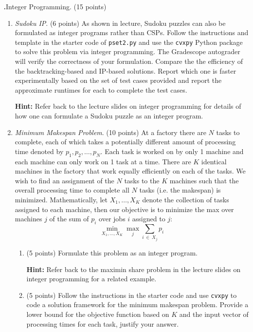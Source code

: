 \documentclass[12pt]{amsart}
\newenvironment{statement}[1]{\smallskip\noindent\color[rgb]{0.0,0.0,0.0} {\bf #1.}}{}
\theoremstyle{definition}
\theoremstyle{remark}
\newcommand{\1}{\mathds{1}}
\begin{document}
\newpage

\begin{statement}{5}
\emph{Integer Programming}. (15 points)
\begin{enumerate}
    \item \emph{Sudoku IP}. (6 points) As shown in lecture, Sudoku puzzles can also be formulated as integer programs rather than CSPs. Follow the instructions and template in the starter code of \texttt{pset2.py} and use the \texttt{cvxpy} Python package to solve this problem via integer programming. The Gradescope autograder will verify the correctness of your formulation. Compare the the efficiency of the backtracking-based and IP-based solutions. Report which one is faster experimentally based on the set of test cases provided and report the approximate runtimes for each to complete the test cases.
    
    \noindent\textbf{Hint:} Refer back to the lecture slides on integer programming for details of how one can formulate a Sudoku puzzle as an integer program. 
    
    \item \emph{Minimum Makespan Problem}. (10 points) At a factory there are $N$ tasks to complete, each of which takes a potentially different amount of processing time denoted by $p_1, p_2, \ldots, p_N$. Each task is worked on by only 1 machine and each machine can only work on 1 task at a time. There are $K$ identical machines in the factory that work equally efficiently on each of the tasks. We wish to find an assignment of the $N$ tasks to the $K$ machines such that the overall processing time to complete all $N$ tasks (i.e. the makespan) is minimized. Mathematically, let $X_1, \ldots, X_K$ denote the collection of tasks assigned to each machine, then our objective is to minimize the max over machines $j$ of the sum of $p_i$ over jobs $i$ assigned to $j$:
    $$
    \underset{X_1, \ldots, X_K}{\min} \underset{j}{\max} \sum_{i \: \in \: X_j} p_i 
    $$
    
    \begin{enumerate}
        \item (5 points) Formulate this problem as an integer program.
        
        \noindent\textbf{Hint:} Refer back to the maximin share problem in the lecture slides on integer programming for a related example. 
        \item (5 points) Follow the instructions in the starter code and use \texttt{cvxpy} to code a solution framework for the minimum makespan problem. Provide a lower bound for the objective function based on $K$ and the input vector of processing times for each task, justify your answer.
    \end{enumerate}
\end{enumerate}

\end{statement}
\end{document}
